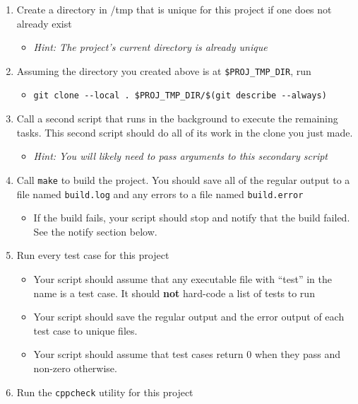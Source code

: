 \documentclass{article}
\begin{document}
\begin{enumerate}
  \item Create a directory in /tmp that is unique for this project if one does not already exist
    \begin{itemize}
      \item \small \em Hint: The project's current directory is already unique
    \end{itemize}
  \item Assuming the directory you created above is at \texttt{\$PROJ\_TMP\_DIR}, run
    \begin{itemize}
      \item \texttt{git clone -{}-local .\ \$PROJ\_TMP\_DIR/\$(git describe -{}-always)}
    \end{itemize}
  \item Call a second script that runs in the background to execute the
    remaining tasks. This second script should do all of its work in the clone
    you just made.
    \begin{itemize}
      \item \small \em Hint: You will likely need to pass arguments to this secondary script
    \end{itemize}
  \item Call \texttt{make} to build the project. You should save all of the
    regular output to a file named \texttt{build.log} and any errors to a file
    named \texttt{build.error}
    \begin{itemize}
      \item If the build fails, your script should stop and notify that the
        build failed. See the notify section below.
    \end{itemize}
  \item Run every test case for this project
    \begin{itemize}
      \item Your script should assume that any executable file with ``test''
        in the name is a test case. It should \textbf{not} hard-code a list of
        tests to run
      \item Your script should save the regular output and the error output of
        each test case to unique files.
      \item Your script should assume that test cases return 0 when they
        pass and non-zero otherwise.
    \end{itemize}
  \item Run the \texttt{cppcheck} utility for this project

\end{enumerate}
\end{document}
